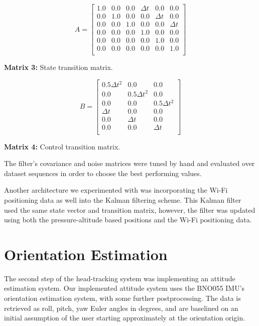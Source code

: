 \[
A =
\begin{bmatrix}
1.0 & 0.0 & 0.0 & \Delta t & 0.0 & 0.0 \\
0.0 & 1.0 & 0.0 & 0.0 & \Delta t & 0.0 \\
0.0 & 0.0 & 1.0 & 0.0 & 0.0 & \Delta t \\
0.0 & 0.0 & 0.0 & 1.0 & 0.0 & 0.0 \\
0.0 & 0.0 & 0.0 & 0.0 & 1.0 & 0.0 \\
0.0 & 0.0 & 0.0 & 0.0 & 0.0 & 1.0 \\
\end{bmatrix}
\]
\begin{center}
\textbf{Matrix 3:} State transition matrix.
\end{center}

\[
B =
\begin{bmatrix}
0.5\Delta t^2 & 0.0 & 0.0 \\
0.0 & 0.5\Delta t^2 & 0.0 \\
0.0 & 0.0 & 0.5\Delta t^2 \\
\Delta t & 0.0 & 0.0 \\
0.0 & \Delta t & 0.0 \\
0.0 & 0.0 & \Delta t \\
\end{bmatrix}
\]
\begin{center}
\textbf{Matrix 4:} Control transition matrix.
\end{center}

\par
The filter's covariance and noise matrices were tuned by hand and evaluated over dataset sequences in order to choose the best performing values.
\par
Another architecture we experimented with was incorporating the Wi-Fi positioning data as well into the Kalman filtering scheme. This Kalman filter used the same state vector and transition matrix, however, the filter was updated using both the pressure-altitude based positions and the Wi-Fi positioning data.

\section{Orientation Estimation}
The second step of the head-tracking system was implementing an attitude estimation system. Our implemented attitude system uses the BNO055 IMU's orientation estimation system, with some further postprocessing. The data is retrieved as roll, pitch, yaw Euler angles in degrees, and are baselined on an initial assumption of the user starting approximately at the orientation origin. \cite{bno055}

